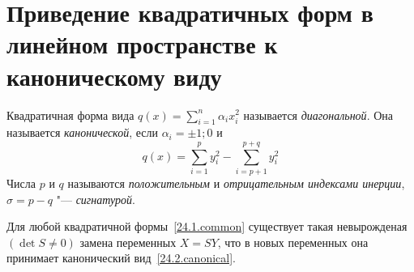   \section{Приведение квадратичных форм в линейном пространстве к каноническому виду}
  \begin{defn}
  Квадратичная форма вида $q(x)=\sum\limits_{i=1}^n\alpha_ix_i^2$ называется \textit{диагональной}. Она называется \textit{канонической}, если $\alpha_i=\pm 1;0$ и 
  \begin{equation}\label{24.2.canonical}
  q(x)=\sum\limits_{i=1}^py_i^2-\sum\limits_{i=p+1}^{p+q}y_i^2
  \end{equation} 
  Числа $p$ и $q$ называются \textit{положительным} и \textit{отрицательным индексами инерции}, $\sigma=p-q$ "--- \textit{сигнатурой}.
  \end{defn}
  \begin{thm}
  Для любой квадратичной формы~\eqref{24.1.common} существует такая невырожденая $(\det S \neq 0)$ замена переменных $X=SY$, что в новых переменных она принимает канонический вид~\eqref{24.2.canonical}.
  \end{thm}
